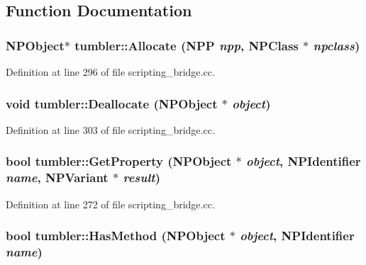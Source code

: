 \subsection{Function Documentation}
\hypertarget{namespacetumbler_a133c46b3658a35f597bf5806a58c433e}{
\subsubsection[{Allocate}]{\setlength{\rightskip}{0pt plus 5cm}NPObject$\ast$ tumbler::Allocate ({\bf NPP} {\em npp}, \/  NPClass $\ast$ {\em npclass})}}
\label{namespacetumbler_a133c46b3658a35f597bf5806a58c433e}


Definition at line 296 of file scripting\_\-bridge.cc.

\hypertarget{namespacetumbler_a6e665bba23bf978176f39f24fd07d501}{
\subsubsection[{Deallocate}]{\setlength{\rightskip}{0pt plus 5cm}void tumbler::Deallocate (NPObject $\ast$ {\em object})}}
\label{namespacetumbler_a6e665bba23bf978176f39f24fd07d501}


Definition at line 303 of file scripting\_\-bridge.cc.

\hypertarget{namespacetumbler_a41d6ba518f6ce31f8fafc12eb9dd044c}{
\subsubsection[{GetProperty}]{\setlength{\rightskip}{0pt plus 5cm}bool tumbler::GetProperty (NPObject $\ast$ {\em object}, \/  NPIdentifier {\em name}, \/  NPVariant $\ast$ {\em result})}}
\label{namespacetumbler_a41d6ba518f6ce31f8fafc12eb9dd044c}


Definition at line 272 of file scripting\_\-bridge.cc.

\hypertarget{namespacetumbler_a0440bebe4c3872dbed8390142035d1d1}{
\subsubsection[{HasMethod}]{\setlength{\rightskip}{0pt plus 5cm}bool tumbler::HasMethod (NPObject $\ast$ {\em object}, \/  NPIdentifier {\em name})}}
\label{namespacetumbler_a0440bebe4c3872dbed8390142035d1d1}


